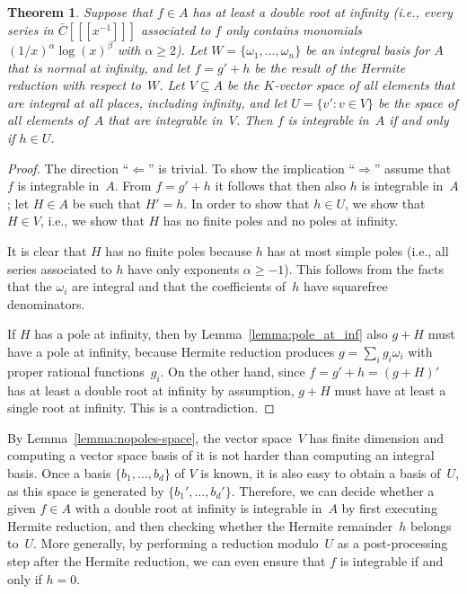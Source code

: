 \documentclass[final,1p,times,authoryear]{elsarticle}
\newtheorem{theorem}{Theorem}
\begin{document}
\begin{theorem}\label{thm:intiff0}
  Suppose that $f\in A$ has at least a double root at infinity (i.e., every
  series in $\bar C[[[x^{-1}]]]$ associated to $f$ only contains monomials
  $(1/x)^\alpha\log(x)^\beta$ with $\alpha\geq2$).
  Let $W=\{\omega_1,\dots,\omega_n\}$ be an integral basis for $A$ that is normal at infinity,
  and let $f=g'+h$ be the  result of the Hermite reduction with respect to~$W$.
  Let $V\subseteq A$ be the $K$-vector space of all elements that are integral at all places,
  including infinity, and let $U=\{v':v\in V\}$ be the space of all elements of~$A$
  that are integrable in~$V$.
  Then $f$ is integrable in~$A$ if and only if $h\in U$.
\end{theorem}

\begin{proof}
The direction ``$\Leftarrow$'' is trivial. To show the implication
``$\Rightarrow$'' assume that $f$ is integrable in~$A$. From $f=g'+h$ it follows that
then also $h$ is integrable in~$A$; let $H\in A$ be such that $H'=h$.  In order to show
that $h\in U$, we show that $H\in V$, i.e., we show that $H$ has no finite poles and
no poles at infinity.

It is clear that $H$ has no finite poles because $h$ has at most simple poles
(i.e., all series associated to $h$ have only exponents $\alpha\geq-1$).
This follows from the facts that the $\omega_i$ are integral and that
the coefficients of~$h$ have squarefree denominators.

If $H$ has a pole at infinity, then by Lemma~\ref{lemma:pole_at_inf} also
$g+H$ must have a pole at infinity, because Hermite reduction produces
$g=\sum_i g_i\omega_i$ with proper rational functions~$g_i$.  On the other
hand, since $f=g'+h=(g+H)'$ has at least a double root at infinity by
assumption, $g+H$ must have at least a single root at infinity. This is
a contradiction.
\end{proof}

By Lemma~\ref{lemma:nopoles-space}, the vector space~$V$ has finite dimension and computing a
vector space basis of it is not harder than computing an integral basis. Once
a basis $\{b_1,\dots,b_d\}$ of $V$ is known, it is also easy to obtain a basis
of~$U$, as this space is generated by $\{b_1',\dots,b_d'\}$. Therefore, we
can decide whether a given $f\in A$ with a double root at infinity is integrable in~$A$
by first executing Hermite reduction, and then checking whether the Hermite
remainder~$h$ belongs to~$U$. More generally, by performing a reduction modulo~$U$
as a post-processing step after the Hermite reduction, we can even ensure that $f$
is integrable if and only if $h=0$.
\end{document}
